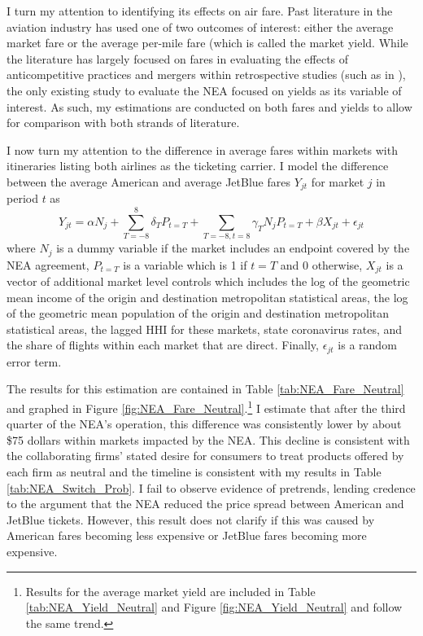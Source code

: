 \documentclass{article}
\begin{document}
	 I turn my attention to identifying its effects on air fare. Past literature in the aviation industry has used one of two outcomes of interest: either the average market fare or the average per-mile fare (which is called the market yield.  While the literature has largely focused on fares in evaluating the effects of anticompetitive practices and mergers within retrospective studies (such as in \citet{luo_price_2014, carlton_are_2019}), the only existing study \citep{zou_assessing_2023} to evaluate the NEA focused on yields as its variable of interest. As such, my estimations are conducted on both fares and yields to allow for comparison with both strands of literature. 
	
	 I now turn my attention to the difference in average fares within markets with itineraries listing both airlines as the ticketing carrier.  I model the difference between the average American and average JetBlue fares $Y_{jt}$ for market $j$ in period $t$ as \[Y_{jt} = \alpha N_{j} + \sum_{T = -8}^{8} \delta_{T} P_{t = T} + \sum_{T = -8, t = 8} \gamma_{T} N_{j} P_{t = T} + \beta X_{jt} + \epsilon_{jt}\] where $N_{j}$ is a dummy variable if the market includes an endpoint covered by the NEA agreement, $P_{t = T}$ is a variable which is 1 if $t = T$ and 0 otherwise, $X_{jt}$ is a vector of additional market level controls which includes the log of the geometric mean income of the origin and destination metropolitan statistical areas, the log of the geometric mean population of the origin and destination metropolitan statistical areas, the lagged HHI for these markets, state coronavirus rates, and the share of flights within each market that are direct. Finally, $\epsilon_{jt}$ is a random error term. 
	 
	 The results for this estimation are contained in Table \ref{tab:NEA_Fare_Neutral} and graphed in Figure \ref{fig:NEA_Fare_Neutral}.\footnote{ Results for the average market yield are included in Table \ref{tab:NEA_Yield_Neutral} and Figure \ref{fig:NEA_Yield_Neutral} and follow the same trend.} I estimate that after the third quarter of the NEA's operation, this difference was consistently lower by about \$75 dollars within markets impacted by the NEA. This decline is consistent with the collaborating firms' stated desire for consumers to treat products offered by each firm as neutral and the timeline is consistent with my results in Table \ref{tab:NEA_Switch_Prob}. I fail to observe evidence of pretrends, lending credence to the argument that the NEA reduced the price spread between American and JetBlue tickets. However, this result does not clarify if this was caused by American fares becoming less expensive or JetBlue fares becoming more expensive. 
	
\end{document}
